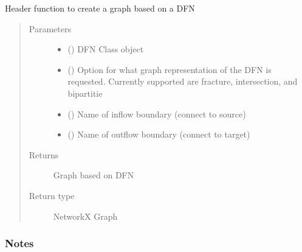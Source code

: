 \documentclass[letterpaper,10pt,english]{sphinxmanual}
\begin{document}

\begin{fulllineitems}
\label{\detokenize{pydfnworks:pydfnworks.dfnGraph.dfn2graph.create_graph}}
Header function to create a graph based on a DFN
\begin{quote}\begin{description}
\item[{Parameters}] \leavevmode\begin{itemize}
\item {} 
 () \textendash{} DFN Class object

\item {} 
 () \textendash{} Option for what graph representation of the DFN is requested. Currently supported are fracture, intersection, and bipartitie

\item {} 
 () \textendash{} Name of inflow boundary (connect to source)

\item {} 
 () \textendash{} Name of outflow boundary (connect to target)

\end{itemize}

\item[{Returns}] \leavevmode
{} \textendash{} Graph based on DFN

\item[{Return type}] \leavevmode
NetworkX Graph

\end{description}\end{quote}
\subsubsection*{Notes}

\end{fulllineitems}
\end{document}
